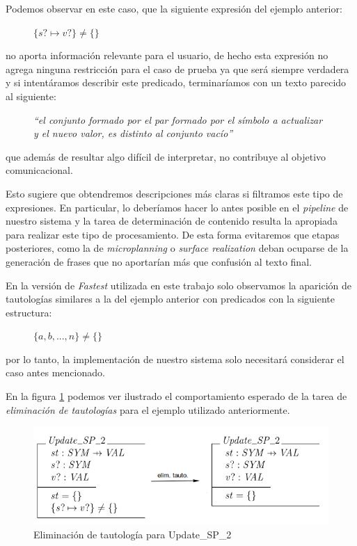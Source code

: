 Podemos observar en este caso, que la siguiente expresión del ejemplo anterior:

\begin{figure}[H]
  \centering
  $\{ s? \mapsto v? \} \neq \{ \}$ 
\end{figure}

\noindent
no aporta información relevante para el usuario, de hecho esta expresión no agrega ninguna restricción para el caso de prueba ya que será siempre verdadera y si intentáramos describir este predicado, terminaríamos con un texto parecido al siguiente:

\begin{figure}[H]
  \centering
  \emph{``el conjunto formado por el par formado por el símbolo a actualizar y el nuevo valor, es distinto al conjunto vacío''}
\end{figure}

\noindent
que además de resultar algo difícil de interpretar, no contribuye al objetivo comunicacional.

Esto sugiere que obtendremos descripciones más claras si filtramos este tipo de expresiones. En particular, lo deberíamos hacer lo antes posible en el \textit{pipeline} de nuestro sistema y la tarea de determinación de contenido resulta la apropiada para realizar este tipo de procesamiento. De esta forma evitaremos que etapas posteriores, como la de \emph{microplanning} o \emph{surface realization} deban ocuparse de la generación de frases que no aportarían más que confusión al texto final.

En la versión de \emph{Fastest} utilizada en este trabajo solo observamos la aparición de tautologías similares a la del ejemplo anterior con predicados con la siguiente estructura:

\begin{figure}[H]
  \centering
  $\{ a, b, ... , n \} \neq \{ \}$ 
\end{figure}

\noindent
por lo tanto, la implementación de nuestro sistema solo necesitará considerar el caso antes mencionado. 

En la figura \ref{fig:ej_elim_tauto} podemos ver ilustrado el comportamiento esperado de la tarea de \emph{eliminación de tautologías} para el ejemplo utilizado anteriormente.

\begin{figure}[H]
  	\centering
	\includegraphics[scale=0.4]{img/ej_elim_tauto.png}
	\caption{Eliminación de tautología para Update\_SP\_2}
  	\label{fig:ej_elim_tauto}
\end{figure}

